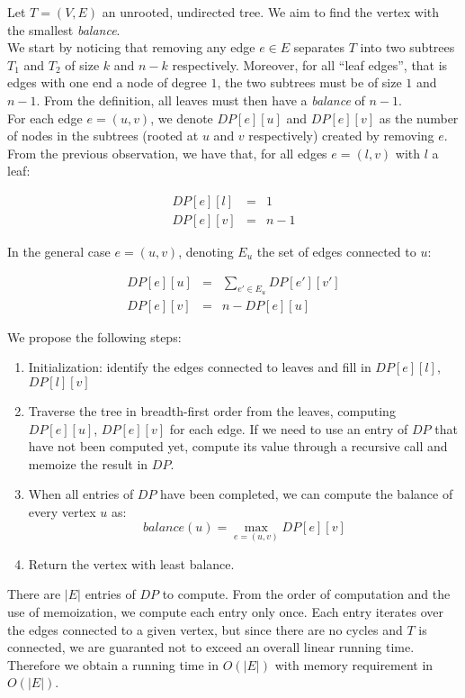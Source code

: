 
Let $T = (V, E)$ an unrooted, undirected tree. We aim to find the vertex with the smallest \textit{balance}.\\

We start by noticing that removing any edge $e \in E$ separates $T$ into two subtrees $T_1$ and $T_2$ of size $k$ and $n - k$ respectively. Moreover, for all ``leaf edges'', that is edges with one end a node of degree $1$, the two subtrees must be of size $1$ and $n - 1$. From the definition, all leaves must then have a \textit{balance} of $n - 1$.\\

For each edge $e = (u, v)$, we denote $DP[e][u]$ and $DP[e][v]$ as the number of nodes in the subtrees (rooted at $u$ and $v$ respectively) created by removing $e$. From the previous observation, we have that, for all edges $e = (l, v)$ with $l$ a leaf:

\[
\begin{array}{rcl}
  DP[e][l] & = & 1 \\
  DP[e][v] & = & n - 1
\end{array}
\]

\noindent
In the general case $e = (u, v)$, denoting $E_u$ the set of edges connected to $u$:

\[
\begin{array}{rcl}
  DP[e][u] & = & {\displaystyle \sum_{e\prime \in E_u} DP[e\prime][v\prime]}\\
  DP[e][v] & = & n - DP[e][u]
\end{array}
\]

\noindent
We propose the following steps:

\begin{enumerate}
  \item Initialization: identify the edges connected to leaves and fill in $DP[e][l]$, $DP[l][v]$
  \item Traverse the tree in breadth-first order from the leaves, computing $DP[e][u]$, $DP[e][v]$ for each edge. If we need to use an entry of $DP$ that have not been computed yet, compute its value through a recursive call and memoize the result in $DP$.
  \item When all entries of $DP$ have been completed, we can compute the balance of every vertex $u$ as:
  \[
    balance(u) = \max_{e = (u, v)} { DP[e][v] }
  \]

  \item Return the vertex with least balance.
\end{enumerate}

There are $|E|$ entries of $DP$ to compute. From the order of computation and the use of memoization, we compute each entry only once. Each entry iterates over the edges connected to a given vertex, but since there are no cycles and $T$ is connected, we are guaranted not to exceed an overall linear running time. Therefore we obtain a running time in $O(|E|)$ with memory requirement in $O(|E|)$.

